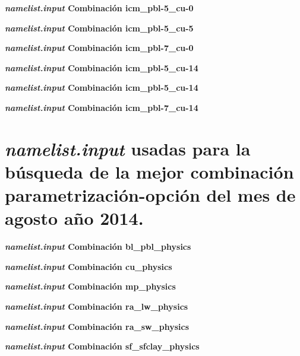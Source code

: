 \textbf{\textit{namelist.input}  Combinación icm\_pbl-5\_cu-0}



\textbf{\textit{namelist.input}  Combinación icm\_pbl-5\_cu-5}



\textbf{\textit{namelist.input}  Combinación icm\_pbl-7\_cu-0}



\textbf{\textit{namelist.input}  Combinación icm\_pbl-5\_cu-14}



\textbf{\textit{namelist.input}  Combinación icm\_pbl-5\_cu-14}



\textbf{\textit{namelist.input}  Combinación icm\_pbl-7\_cu-14}





\section{\textit{namelist.input} usadas para la búsqueda de la mejor combinación parametrización-opción del mes de agosto año 2014.}


\textbf{\textit{namelist.input}  Combinación bl\_pbl\_physics}



\textbf{\textit{namelist.input}  Combinación cu\_physics}



\textbf{\textit{namelist.input}  Combinación mp\_physics}



\textbf{\textit{namelist.input}  Combinación ra\_lw\_physics}



\textbf{\textit{namelist.input}  Combinación ra\_sw\_physics}



\textbf{\textit{namelist.input}  Combinación sf\_sfclay\_physics}



